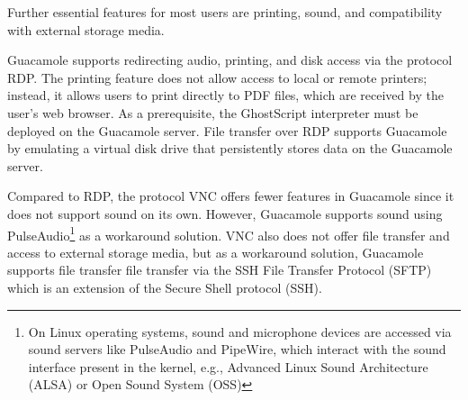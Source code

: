 \documentclass[runningheads]{llncs}
\begin{document}
Further essential features for most users are printing, sound, and compatibility with external storage media. 

Guacamole supports redirecting audio, printing, and disk access via the protocol RDP. The printing feature does not allow access to local or remote printers; instead, it allows users to print directly to PDF files, which are received by the user's web browser. As a prerequisite, the GhostScript interpreter must be deployed on the Guacamole server. File transfer over RDP supports Guacamole by emulating a virtual disk drive that persistently stores data on the Guacamole server.~\cite{ApacheGuacamole2024} 

Compared to RDP, the protocol VNC offers fewer features in Guacamole since it does not support sound on its own. However, Guacamole supports sound using PulseAudio\footnote{On Linux operating systems, sound and microphone devices are accessed via sound servers like PulseAudio and PipeWire, which interact with the sound interface present in the kernel, e.g., Advanced Linux Sound Architecture (ALSA) or Open Sound System (OSS)} as a workaround solution. VNC also does not offer file transfer and access to external storage media, but as a workaround solution, Guacamole supports file transfer file transfer via the SSH File Transfer Protocol (SFTP) which is an extension of the Secure Shell protocol (SSH).
\end{document}
